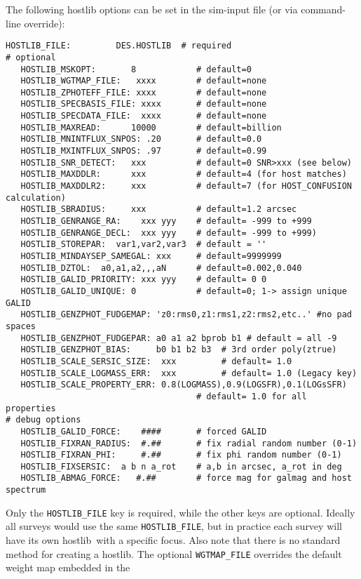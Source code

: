 \documentclass[12pt]{article}
\newcommand{\hostlib}{{\sc hostlib}}
\begin{document}
{The following {\hostlib} options can be set in
the sim-input file (or via command-line override):
%
\begin{Verbatim}[frame=single]
   HOSTLIB_FILE:         DES.HOSTLIB  # required
# optional
   HOSTLIB_MSKOPT:       8            # default=0
   HOSTLIB_WGTMAP_FILE:   xxxx        # default=none
   HOSTLIB_ZPHOTEFF_FILE: xxxx        # default=none
   HOSTLIB_SPECBASIS_FILE: xxxx       # default=none
   HOSTLIB_SPECDATA_FILE:  xxxx       # default=none
   HOSTLIB_MAXREAD:      10000        # default=billion
   HOSTLIB_MNINTFLUX_SNPOS: .20       # default=0.0
   HOSTLIB_MXINTFLUX_SNPOS: .97       # default=0.99
   HOSTLIB_SNR_DETECT:   xxx          # default=0 SNR>xxx (see below)
   HOSTLIB_MAXDDLR:      xxx          # default=4 (for host matches)
   HOSTLIB_MAXDDLR2:     xxx          # default=7 (for HOST_CONFUSION calculation)
   HOSTLIB_SBRADIUS:     xxx          # default=1.2 arcsec
   HOSTLIB_GENRANGE_RA:    xxx yyy    # default= -999 to +999
   HOSTLIB_GENRANGE_DECL:  xxx yyy    # default= -999 to +999)   
   HOSTLIB_STOREPAR:  var1,var2,var3  # default = ''
   HOSTLIB_MINDAYSEP_SAMEGAL: xxx     # default=9999999
   HOSTLIB_DZTOL:  a0,a1,a2,,,aN      # default=0.002,0.040
   HOSTLIB_GALID_PRIORITY: xxx yyy    # default= 0 0 
   HOSTLIB_GALID_UNIQUE: 0            # default=0; 1-> assign unique GALID
   HOSTLIB_GENZPHOT_FUDGEMAP: 'z0:rms0,z1:rms1,z2:rms2,etc..' #no pad spaces
   HOSTLIB_GENZPHOT_FUDGEPAR: a0 a1 a2 bprob b1 # default = all -9
   HOSTLIB_GENZPHOT_BIAS:     b0 b1 b2 b3  # 3rd order poly(ztrue)
   HOSTLIB_SCALE_SERSIC_SIZE:  xxx         # default= 1.0
   HOSTLIB_SCALE_LOGMASS_ERR:  xxx         # default= 1.0 (Legacy key)
   HOSTLIB_SCALE_PROPERTY_ERR: 0.8(LOGMASS),0.9(LOGSFR),0.1(LOGsSFR)   
                                      # default= 1.0 for all properties
# debug options
   HOSTLIB_GALID_FORCE:    ####       # forced GALID 
   HOSTLIB_FIXRAN_RADIUS:  #.##       # fix radial random number (0-1)
   HOSTLIB_FIXRAN_PHI:     #.##       # fix phi random number (0-1)
   HOSTLIB_FIXSERSIC:  a b n a_rot    # a,b in arcsec, a_rot in deg
   HOSTLIB_ABMAG_FORCE:   #.##        # force mag for galmag and host spectrum
\end{Verbatim}
Only the {\tt HOSTLIB\_FILE} key is required, while the
other keys are optional. Ideally all surveys would use
the same {\tt HOSTLIB\_FILE}, but in practice each survey
will have its own \hostlib\ with a specific focus.
Also note that there is no standard method for creating 
a \hostlib. The optional {\tt WGTMAP\_FILE} overrides the 
default weight map embedded in the
}
\end{document}
